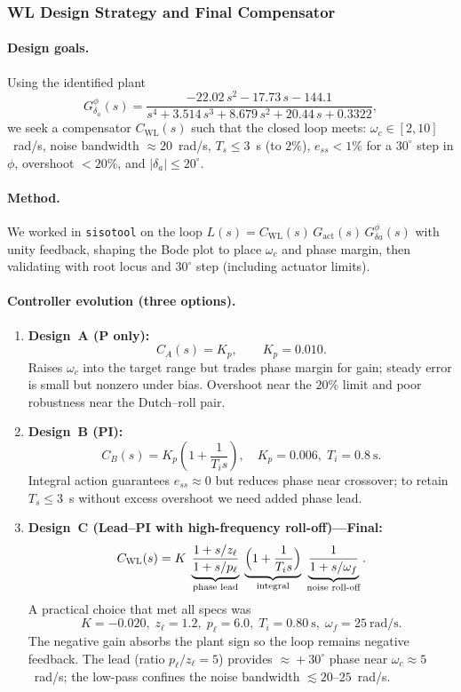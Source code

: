 \subsubsection{WL Design Strategy and Final Compensator}

\paragraph{Design goals.}
Using the identified plant
\[
G^{\phi}_{\delta_a}(s)
= \frac{-22.02\,s^{2} - 17.73\,s - 144.1}{s^{4} + 3.514\,s^{3} + 8.679\,s^{2} + 20.44\,s + 0.3322},
\]
we seek a compensator $C_{\mathrm{WL}}(s)$ such that the closed loop meets:
$\omega_c\in[2,10]$~rad/s, noise bandwidth $\approx 20$~rad/s, $T_s\!\le\!3$~s (to $2\%$),
$e_{ss}\!<\!1\%$ for a $30^\circ$ step in $\phi$, overshoot $<20\%$, and $|\delta_a|\le 20^\circ$.

\paragraph{Method.}
We worked in \texttt{sisotool} on the loop $L(s)=C_{\mathrm{WL}}(s)\,G_{\mathrm{act}}(s)\,G^{\phi}_{\delta a}(s)$ with
unity feedback, shaping the Bode plot to place $\omega_c$ and phase margin, then validating with
root locus and $30^\circ$ step (including actuator limits).

\paragraph{Controller evolution (three options).}
\begin{enumerate}
\item \textbf{Design~A (P only):}
\[
C_A(s)=K_p, \qquad K_p = 0.010.
\]
Raises $\omega_c$ into the target range but trades phase margin for gain; steady error is small but nonzero under bias. Overshoot near the $20\%$ limit and poor robustness near the Dutch–roll pair.

\item \textbf{Design~B (PI):}
\[
C_B(s)=K_p\!\left(1+\frac{1}{T_i s}\right), \quad K_p=0.006,\; T_i=0.8~\mathrm{s}.
\]
Integral action guarantees $e_{ss}\!\approx 0$ but reduces phase near crossover; to retain $T_s\!\le\!3$~s without excess overshoot we need added phase lead.

\item \textbf{Design~C (Lead–PI with high-frequency roll-off)\;—\;Final:}
\[
C_{\mathrm{WL}}(s)
= K\;\underbrace{\frac{1+s/z_\ell}{1+s/p_\ell}}_{\text{phase lead}}\;
\underbrace{\Bigl(1+\frac{1}{T_i s}\Bigr)}_{\text{integral}}\;
\underbrace{\frac{1}{1+s/\omega_f}}_{\text{noise roll-off}}.
\]
A practical choice that met all specs was
\[
\boxed{~
K=-0.020,\;
z_\ell=1.2,\;
p_\ell=6.0,\;
T_i=0.80~\mathrm{s},\;
\omega_f=25~\mathrm{rad/s}.
~}
\]
The negative gain absorbs the plant sign so the loop remains negative feedback.
The lead (ratio $p_\ell/z_\ell\!=\!5$) provides $\approx\!+30^\circ$ phase near
$\omega_c\!\approx\!5$~rad/s; the low-pass confines the noise bandwidth $\lesssim 20$--$25$~rad/s.
\end{enumerate}


